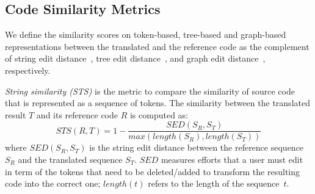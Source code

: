 \subsection{Code Similarity Metrics}

We define the similarity scores on token-based, tree-based and
graph-based representations between the translated and the
reference code as the complement of string edit
distance~\cite{levenshtein}, tree edit distance~\cite{oopsla10}, and
graph edit distance~\cite{sanfeliu}, respectively.

\textit{String similarity (STS)} is the metric to compare the
similarity of source code that is represented as a sequence of
tokens. The similarity between the translated result $T$ and its
reference code $R$ is computed as:
$$STS(R, T) = 1 - \frac{SED(S_R, S_T)}{max\left(length(S_R), length(S_T)\right)}$$
where $SED(S_R, S_T)$ is the string edit distance between the
reference sequence $S_R$ and the translated sequence $S_T$. $SED$
measures efforts that a user must edit in term of the tokens that need
to be deleted/added to transform the resulting code into the correct one;
$length(t)$ refers to the length of the sequence~$t$.



